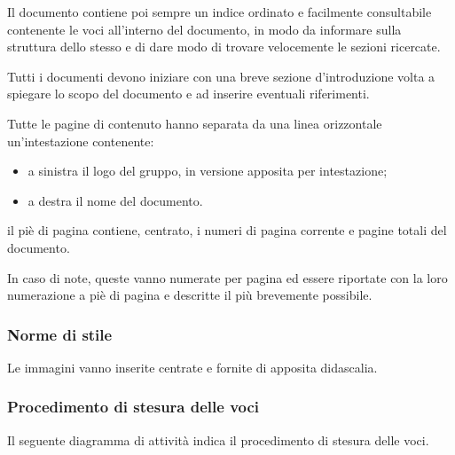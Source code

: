 	    Il documento contiene poi sempre un indice ordinato e facilmente consultabile contenente le voci all'interno del documento, in modo da informare sulla struttura dello stesso e di dare modo di trovare velocemente le sezioni ricercate.
	    
	    
	    Tutti i documenti devono iniziare con una breve sezione d'introduzione volta a spiegare lo scopo del documento e ad inserire eventuali riferimenti.
	    
	    
	    Tutte le pagine di contenuto hanno separata da una linea orizzontale un'intestazione contenente:
	    \begin{itemize}
	        \item a sinistra il logo del gruppo, in versione apposita per intestazione;
	        \item a destra il nome del documento.
	    \end{itemize}
	    
	    
	    il piè di pagina contiene, centrato, i numeri di pagina corrente e pagine totali del documento.
	    
	    
	    In caso di note, queste vanno numerate per pagina ed essere riportate con la loro numerazione a piè di pagina e descritte il più brevemente possibile.
	    
	    
	    
	    \subsubsection{Norme di stile}
	    
	    Le immagini vanno inserite centrate e fornite di apposita didascalia.
	     \subsubsection{Procedimento di stesura delle voci}
	    Il seguente diagramma di attività indica il procedimento di stesura delle voci.\\
	    
